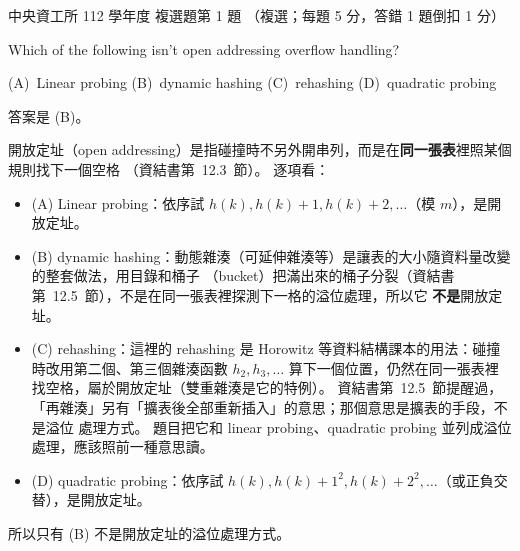 \begin{pastexam}[label={px:ncu-112-dsa-01}]{中央資工所 112 學年度 複選題第 1 題}
（複選；每題 5 分，答錯 1 題倒扣 1 分）

Which of the following isn't open addressing overflow handling?

(A)~Linear probing \qquad (B)~dynamic hashing \qquad (C)~rehashing \qquad (D)~quadratic probing
\end{pastexam}

\begin{pastsoln}
答案是 (B)。

開放定址（open addressing）是指碰撞時不另外開串列，而是在\textbf{同一張表}裡照某個規則找下一個空格
（資結書第~12.3~節）。 逐項看：
\begin{itemize}
\item (A) Linear probing：依序試 $h(k), h(k) + 1, h(k) + 2, \ldots$（模 $m$），是開放定址。
\item (B) dynamic hashing：動態雜湊（可延伸雜湊等）是讓表的大小隨資料量改變的整套做法，用目錄和桶子
（bucket）把滿出來的桶子分裂（資結書第~12.5~節），不是在同一張表裡探測下一格的溢位處理，所以它
\textbf{不是}開放定址。
\item (C) rehashing：這裡的 rehashing 是 Horowitz 等資料結構課本的用法：碰撞時改用第二個、第三個雜湊函數
$h_2, h_3, \ldots$ 算下一個位置，仍然在同一張表裡找空格，屬於開放定址（雙重雜湊是它的特例）。
資結書第~12.5~節提醒過，「再雜湊」另有「擴表後全部重新插入」的意思；那個意思是擴表的手段，不是溢位
處理方式。 題目把它和 linear probing、quadratic probing 並列成溢位處理，應該照前一種意思讀。
\item (D) quadratic probing：依序試 $h(k), h(k) + 1^2, h(k) + 2^2, \ldots$（或正負交替），是開放定址。
\end{itemize}
所以只有 (B) 不是開放定址的溢位處理方式。
\end{pastsoln}
